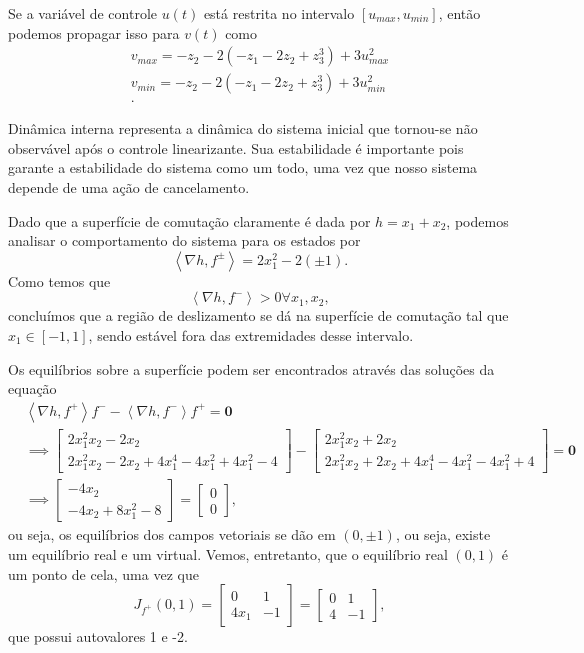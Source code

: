\documentclass[a4paper]{report}
\begin{document}
Se a variável de controle $u(t)$ está restrita no intervalo $[u_{max}, u_{min}]$, então podemos propagar isso para $v(t)$ como
\begin{align*}
    v_{max} = -z_2 -2\left( -z_1 -2z_2 + z_3^3  \right) +3u_{max}^2 \\
    v_{min} = -z_2 -2\left( -z_1 -2z_2 + z_3^3  \right) +3u_{min}^2 \\
.\end{align*}


Dinâmica interna representa a dinâmica do sistema inicial que tornou-se não observável após o controle linearizante. Sua estabilidade é importante pois garante a estabilidade do sistema como um todo, uma vez que nosso sistema depende de uma ação de cancelamento.



Dado que a superfície de comutação claramente é dada por $h = x_1+x_2$, podemos analisar o comportamento do sistema para os estados por \[
    \left< \nabla h , f^{\pm} \right> = 2x_1^2 - 2 (\pm 1)
.\] Como temos que \[
\left< \nabla h , f^{-} \right> >0 \forall x_1,x_2
,\] concluímos que a região de deslizamento se dá na superfície de comutação tal que $x_1\in \left[ -1, 1 \right] $, sendo estável fora das extremidades desse intervalo.

Os equilíbrios sobre a superfície podem ser encontrados através das soluções da equação
\begin{align*}
 &\left< \nabla h , f^{+} \right>f^{-} - \left< \nabla h , f^{-} \right>f^{+} = \bm{0} \\
 &\implies \begin{bmatrix} 2x_1^2x_2 -2x_2  \\ 2x_1^2x_2-2x_2 + 4x_1^{4} -4x_1^2 + 4x_1^2 -4 \end{bmatrix} - \begin{bmatrix} 2x_1^2x_2 +2x_2  \\ 2x_1^2x_2+2x_2 + 4x_1^{4} -4x_1^2 - 4x_1^2 +4 \end{bmatrix}  = \bm{0} \\
 &\implies \begin{bmatrix} 
     -4x_2 \\
     -4x_2+8x_1^2-8
 \end{bmatrix} = \begin{bmatrix} 0 \\ 0 \end{bmatrix} 
,\end{align*}
ou seja, os equilíbrios dos campos vetoriais se dão em $(0,\pm1)$, ou seja, existe um equilíbrio real e um virtual. Vemos, entretanto, que o equilíbrio real $\left( 0,1 \right) $ é um ponto de cela, uma vez que \[
    J_{f^{+}}\left( 0,1 \right) = \begin{bmatrix} 0 & 1 \\ 4x_1 & -1 \end{bmatrix} = \begin{bmatrix} 0 & 1 \\ 4 & -1 \end{bmatrix} 
,\] que possui autovalores 1 e -2.
\end{document}
